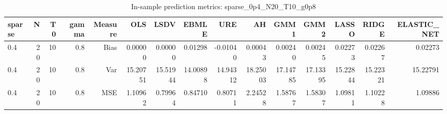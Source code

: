 \begin{table}[!htbp]\centering
\caption{In-sample prediction metrics: sparse_0p4_N20_T10_g0p8}
\label{tab:table2_sparse_0p4_N20_T10_g0p8}
\begin{tabular}{lrrrrrrrrrrrrrr}
\hline
sparse & N & T0 & gamma & Measure & OLS & LSDV & EBMLE & URE & AH & GMM1 & GMM2 & LASSO & RIDGE & ELASTIC_NET \\
\hline
0.4 & 20 & 10 & 0.8 & Bias & 0.00000 & 0.00000 & 0.01298 & -0.01040 & 0.00043 & 0.00240 & 0.00245 & 0.02273 & 0.02267 & 0.02273 \\
0.4 & 20 & 10 & 0.8 & Var & 15.20751 & 15.51944 & 14.00898 & 14.94312 & 18.25003 & 17.14785 & 17.13395 & 15.22844 & 15.22321 & 15.22791 \\
0.4 & 20 & 10 & 0.8 & MSE & 1.10962 & 0.79964 & 0.84710 & 0.80711 & 2.24528 & 1.58767 & 1.58307 & 1.09811 & 1.10228 & 1.09886 \\
\hline
\end{tabular}
\end{table}

